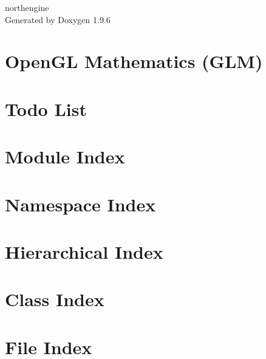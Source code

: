 \documentclass[twoside]{book}
\newcommand{\+}{\discretionary{\mbox{\scriptsize$\hookleftarrow$}}{}{}}
\newcommand{\clearemptydoublepage}{%
    \newpage{\pagestyle{empty}\cleardoublepage}%
  }
\begin{document}
  \raggedbottom
    \hypersetup{pageanchor=false,
                bookmarksnumbered=true,
                pdfencoding=unicode
               }
  \begin{titlepage}
  \vspace*{7cm}
  \begin{center}%
  {\Large northengine}\\
  \vspace*{1cm}
  {\large Generated by Doxygen 1.9.6}\\
  \end{center}
  \end{titlepage}
  \clearemptydoublepage
  \tableofcontents
  \clearemptydoublepage
  \hypersetup{pageanchor=true}
\chapter{Open\+GL Mathematics (GLM)}
\label{index}\hypertarget{index}{}
\chapter{Todo List}
\label{todo}

\chapter{Module Index}

\chapter{Namespace Index}

\chapter{Hierarchical Index}

\chapter{Class Index}

\chapter{File Index}

\end{document}
